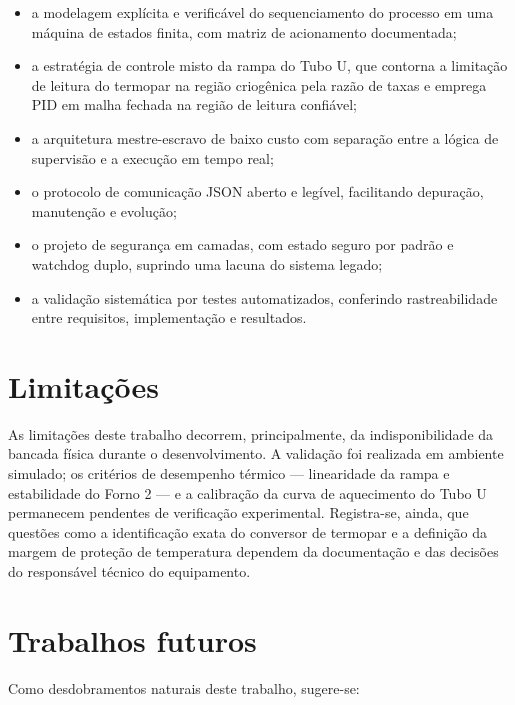 \begin{itemize}
  \item a modelagem explícita e verificável do sequenciamento do processo em uma
  máquina de estados finita, com matriz de acionamento documentada;
  \item a estratégia de controle misto da rampa do Tubo U, que contorna a
  limitação de leitura do termopar na região criogênica pela razão de taxas e
  emprega PID em malha fechada na região de leitura confiável;
  \item a arquitetura mestre-escravo de baixo custo com separação entre a lógica
  de supervisão e a execução em tempo real;
  \item o protocolo de comunicação JSON aberto e legível, facilitando
  depuração, manutenção e evolução;
  \item o projeto de segurança em camadas, com estado seguro por padrão e
  watchdog duplo, suprindo uma lacuna do sistema legado;
  \item a validação sistemática por testes automatizados, conferindo
  rastreabilidade entre requisitos, implementação e resultados.
\end{itemize}

\section{Limitações}

As limitações deste trabalho decorrem, principalmente, da indisponibilidade da
bancada física durante o desenvolvimento. A validação foi realizada em ambiente
simulado; os critérios de desempenho térmico --- linearidade da rampa e
estabilidade do Forno 2 --- e a calibração da curva de aquecimento do Tubo U
permanecem pendentes de verificação experimental. Registra-se, ainda, que
questões como a identificação exata do conversor de termopar e a definição da
margem de proteção de temperatura dependem da documentação e das decisões do
responsável técnico do equipamento.

\section{Trabalhos futuros}

Como desdobramentos naturais deste trabalho, sugere-se:

